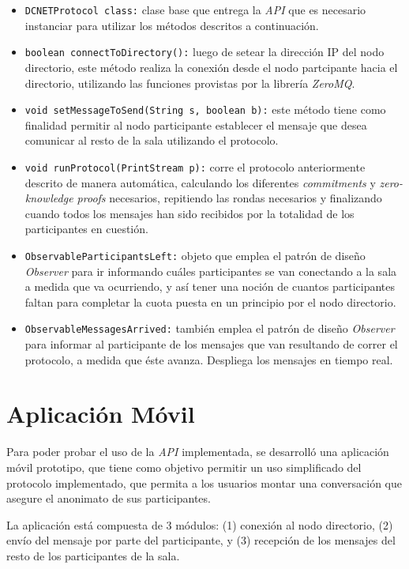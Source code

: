 \begin{itemize}
    \item \texttt{DCNETProtocol class:} clase base que entrega la \emph{API} 
    que es necesario instanciar para utilizar los métodos descritos a 
    continuación. 
    \item \texttt{boolean connectToDirectory():} luego de setear la dirección 
    IP del nodo directorio, este método realiza la conexión desde el nodo partcipante
    hacia el directorio, utilizando las funciones provistas por la librería 
    \emph{ZeroMQ}.
    \item \texttt{void setMessageToSend(String s, boolean b):} este método tiene 
    como finalidad permitir al nodo participante establecer el mensaje que desea 
    comunicar al resto de la sala utilizando el protocolo. 
    \item \texttt{void runProtocol(PrintStream p):} corre el protocolo anteriormente 
    descrito de manera automática, calculando los diferentes \emph{commitments} y 
    \emph{zero-knowledge proofs} necesarios, repitiendo las rondas necesarios 
    y finalizando cuando todos los mensajes han sido recibidos por la totalidad 
    de los participantes en cuestión.
    \item \texttt{ObservableParticipantsLeft:} objeto que emplea el patrón de diseño 
    \emph{Observer} para ir informando cuáles participantes se van conectando a la sala 
    a medida que va ocurriendo, y así tener una noción de cuantos participantes faltan 
    para completar la cuota puesta en un principio por el nodo directorio.
    \item \texttt{ObservableMessagesArrived:} también emplea el patrón de diseño 
    \emph{Observer} para informar al participante de los mensajes que van resultando 
    de correr el protocolo, a medida que éste avanza. Despliega los mensajes en tiempo 
    real.
\end{itemize}

\section{Aplicación Móvil}

Para poder probar el uso de la \emph{API} implementada, se desarrolló una 
aplicación móvil prototipo, que tiene como objetivo permitir un uso simplificado 
del protocolo implementado, que permita a los usuarios montar una conversación 
que asegure el anonimato de sus participantes.

La aplicación está compuesta de 3 módulos: (1) conexión al nodo directorio, (2) envío 
del mensaje por parte del participante, y (3) recepción de los mensajes 
del resto de los participantes de la sala.

